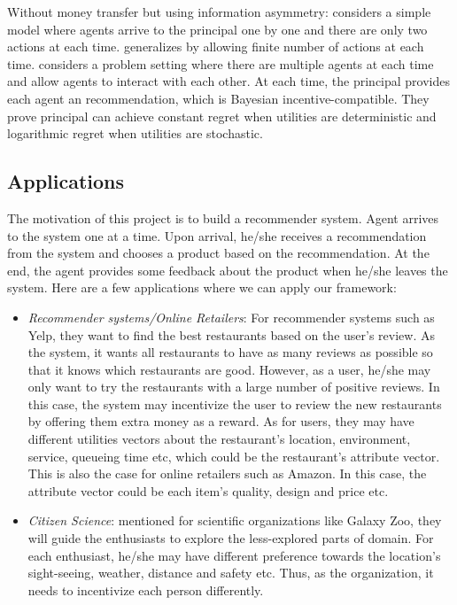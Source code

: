 \documentclass{article}
\begin{document}
Without money transfer but using information asymmetry:
\cite{kremer2014implementing} considers a simple model where agents arrive to the principal one by one and there are only two actions at each time. \cite{mansour2015bayesian} generalizes \cite{kremer2014implementing} by allowing finite number of actions at each time. \cite{mansour2016bayesian} considers a problem setting where there are multiple agents at each time and allow agents to interact with each other. At each time, the principal provides each agent an recommendation, which is Bayesian incentive-compatible. They prove principal can achieve constant regret when utilities are deterministic and logarithmic regret when utilities are stochastic.

\subsection{Applications}

The motivation of this project is to build a recommender system. Agent arrives to the system one at a time. Upon arrival, he/she receives a recommendation from the system and chooses a product based on the recommendation. At the end, the agent provides some feedback about the product when he/she leaves the system.
Here are a few applications where we can apply our framework:

\begin{itemize}
\item \textit{Recommender systems/Online Retailers}: For recommender systems such as Yelp, they want to find the best restaurants based on the user's review. As the system, it wants all restaurants to have as many reviews as possible so that it knows which restaurants are good. However, as a user, he/she may only want to try the restaurants with a large number of positive reviews. In this case, the system may incentivize the user to review the new restaurants by offering them extra money as a reward. As for users, they may have different utilities vectors about the restaurant's location, environment, service, queueing time etc, which could be the restaurant's attribute vector. This is also the case for online retailers such as Amazon. In this case, the attribute vector could be each item's quality, design and price etc.
\item \textit{Citizen Science}:  \cite{frazier2014incentivizing} mentioned for scientific organizations like Galaxy Zoo, they will guide the enthusiasts to explore the less-explored parts of domain. For each enthusiast, he/she may have different preference towards the location's sight-seeing, weather, distance and safety etc. Thus, as the organization, it needs to incentivize each person differently. 
\end{itemize}
\end{document}
